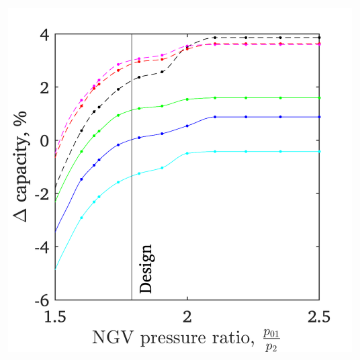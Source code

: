 \documentclass[a4paper, 11pt, oneside]{report}
\begin{document}
\begin{figure}[H]
	\centering
	\begin{subfigure}{.45\textwidth}
		\centering
		\includegraphics[width=\linewidth]{figs/t900_2d_capacity_trends.png}
	\end{subfigure}
	\begin{subfigure}{.1125\textwidth}
		\centering

\end{subfigure}
\end{figure}
\end{document}

